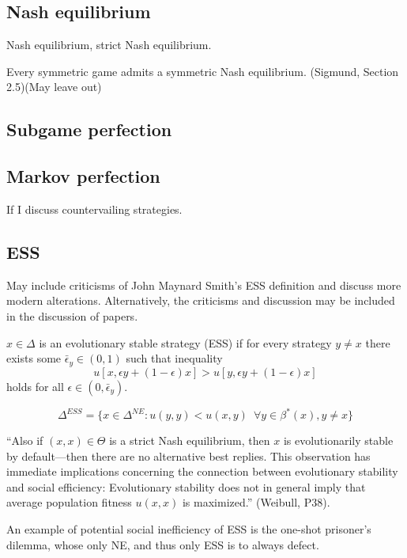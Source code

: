 \subsection{Nash equilibrium}
\begin{definition}
Nash equilibrium, strict Nash equilibrium.
\end{definition}

\begin{theorem}
Every symmetric game admits a symmetric Nash equilibrium. (Sigmund, Section 2.5)(May leave out)
\end{theorem}
\subsection{Subgame perfection}

\subsection{Markov perfection}
If I discuss countervailing strategies. 
 
\subsection{ESS}
May include criticisms of John Maynard Smith's ESS definition and discuss more modern alterations. Alternatively, the criticisms and discussion may be included in the discussion of papers.
\begin{definition}$x \in \Delta$ is an evolutionary stable strategy (ESS) if for every strategy $y \neq x$ there exists some $\bar{\epsilon}_y \in (0, 1)$ such that inequality
\[
u[x, \epsilon y + (1-\epsilon) x ] > u [ y, \epsilon y + (1- \epsilon) x]
\]
holds for all $\epsilon \in (0, \bar{\epsilon}_y)$.
\end{definition}
\begin{proposition}
\[
\Delta^{ESS} = \{ x \in \Delta^{NE} : u(y, y) < u(x, y) \enspace \forall y \in \beta^* (x), y \neq x \}
\]
\end{proposition}


``Also if $(x, x) \in \Theta$ is a strict Nash equilibrium, then $x$ is evolutionarily stable by default---then there are no alternative best replies. This observation has immediate implications concerning the connection between evolutionary stability and social efficiency: Evolutionary stability does not in general imply that average population fitness $u(x, x)$ is maximized.'' (Weibull, P38).

An example of potential social inefficiency of ESS is the one-shot prisoner's dilemma, whose only NE, and thus only ESS is to always defect.

